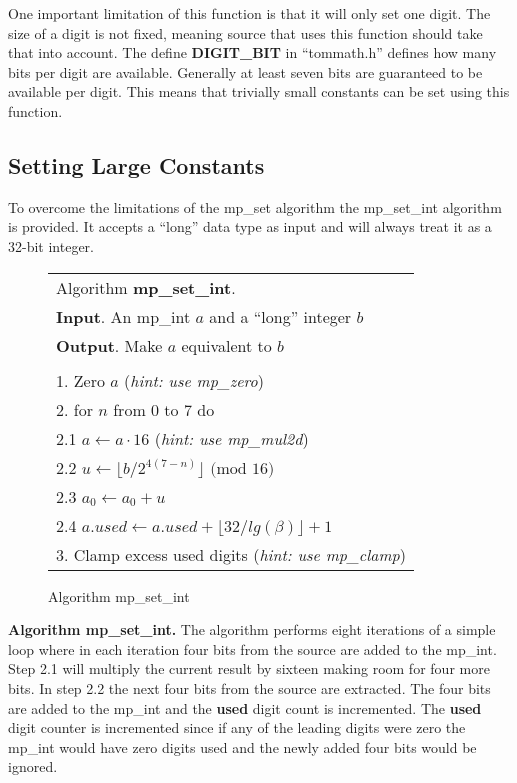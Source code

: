 \documentclass[b5paper]{book}
\begin{document}
One important limitation of this function is that it will only set one digit.  The size of a digit is not fixed, meaning source that uses 
this function should take that into account.  The define \textbf{DIGIT\_BIT} in ``tommath.h'' 
defines how many bits per digit are available.  Generally at least seven bits are guaranteed to be available per 
digit.  This means that trivially small constants can be set using this function.

\subsection{Setting Large Constants}
To overcome the limitations of the mp\_set algorithm the mp\_set\_int algorithm is provided.  It accepts a ``long''
data type as input and will always treat it as a 32-bit integer.

\begin{figure}[here]
\begin{center}
\begin{tabular}{l}
\hline Algorithm \textbf{mp\_set\_int}. \\
\textbf{Input}.   An mp\_int $a$ and a ``long'' integer $b$ \\
\textbf{Output}.  Make $a$ equivalent to $b$ \\
\hline \\
1.  Zero $a$ (\textit{hint: use mp\_zero}) \\
2.  for $n$ from 0 to 7 do \\
\hspace{3mm}2.1  $a \leftarrow a \cdot 16$ (\textit{hint: use mp\_mul2d}) \\
\hspace{3mm}2.2  $u \leftarrow \lfloor b / 2^{4(7 - n)} \rfloor \mbox{ (mod }16\mbox{)}$\\
\hspace{3mm}2.3  $a_0 \leftarrow a_0 + u$ \\
\hspace{3mm}2.4  $a.used \leftarrow a.used + \lfloor 32 / lg(\beta) \rfloor + 1$ \\
3.  Clamp excess used digits (\textit{hint: use mp\_clamp}) \\
\hline
\end{tabular}
\end{center}
\caption{Algorithm mp\_set\_int}
\end{figure}

\textbf{Algorithm mp\_set\_int.}
The algorithm performs eight iterations of a simple loop where in each iteration four bits from the source are added to the 
mp\_int.  Step 2.1 will multiply the current result by sixteen making room for four more bits.  In step 2.2 the
next four bits from the source are extracted.  The four bits are added to the mp\_int and the \textbf{used} digit count is 
incremented.  The \textbf{used} digit counter is incremented since if any of the leading digits were zero the mp\_int would have
zero digits used and the newly added four bits would be ignored.
\end{document}
